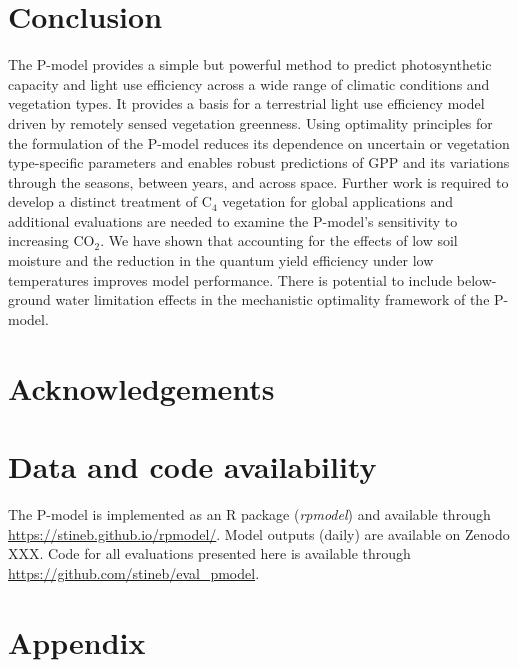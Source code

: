 \documentclass{myreport}
\newcommand{\coo}{CO$_2$}
\begin{document}
\section{Conclusion}

The P-model provides a simple but powerful method to predict photosynthetic capacity and light use efficiency across a wide range of climatic conditions and vegetation types. It provides a basis for a terrestrial light use efficiency model driven by remotely sensed vegetation greenness. Using optimality principles for the formulation of the P-model reduces its dependence on uncertain or vegetation type-specific parameters and enables robust predictions of GPP and its variations through the seasons, between years, and across space. Further work is required to develop a distinct treatment of C$_4$ vegetation for global applications and additional evaluations are needed to examine the P-model's sensitivity to increasing \coo . We have shown that accounting for the effects of low soil moisture and the reduction in the quantum yield efficiency under low temperatures improves model performance. There is potential to include below-ground water limitation effects in the mechanistic optimality framework of the P-model. 


\clearpage

\section{Acknowledgements}


\section{Data and code availability}

The P-model is implemented as an R package (\textit{rpmodel}) and available through \url{https://stineb.github.io/rpmodel/}. Model outputs (daily) are available on Zenodo XXX. Code for all evaluations presented here is available through \url{https://github.com/stineb/eval_pmodel}. 

\section{Appendix}
\end{document}
